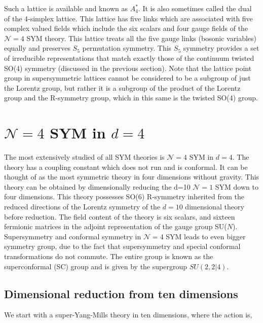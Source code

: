 Such a lattice is available and known as $A_{4}^{*}$.
It is also sometimes called the dual of the 4-simplex lattice.
This lattice has five links which are associated with five complex valued fields which include the six scalars and four gauge 
fields of the $\mathcal{N}=4$ SYM theory. This lattice treats all the five gauge links (bosonic variables) equally 
and preserves $S_{5}$ permutation symmetry. This $S_{5}$ symmetry provides a set of irreducible representations 
that match exactly those of the continuum twisted SO(4) symmetry (discussed in the previous section). Note that the 
lattice point group in supersymmetric lattices cannot be considered to be a subgroup of just the Lorentz group, 
but rather it is a subgroup of the product of the Lorentz group and the R-symmetry group, which in this same is the 
twisted SO(4) group. 



\section{$\mathcal{N} = 4 $ SYM in $d=4$}

The most extensively studied of all SYM theories is $\mathcal{N} = 4 $ SYM in $d=4$. 
The theory has a coupling constant which does not run and is conformal. 
It can be thought of as the most symmetric theory in four dimensions without gravity. 
This theory can be obtained by dimensionally reducing the d=10 $\mathcal{N} = 1 $ SYM down to 
four dimensions. This theory possesses SO(6) R-symmetry inherited from the reduced directions of the Lorentz symmetry of 
the $d=10$ dimensional theory before reduction. The field content of the theory is six scalars, 
and sixteen fermionic matrices in the adjoint representation of the gauge group SU($N$).  
Supersymmetry and conformal symmetry in $\mathcal{N} = 4 $ SYM leads
to even bigger symmetry group, due to the fact that supersymmetry and
special conformal transformations do not commute. 
The entire group is known as the superconformal (SC) group and is given by
the supergroup $SU(2, 2|4)$. 



\subsection{Dimensional reduction from ten dimensions} 

We start with a super-Yang-Mills theory in ten dimensions, where the action is, 

